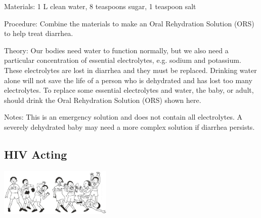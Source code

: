 \begin{multicols}{2}
\begin{description*}
\item[Materials:]{1 L clean water, 8 teaspoons sugar, 1 teaspoon salt}
\item[Procedure:]{Combine the materials to make an Oral Rehydration Solution (ORS) to help treat diarrhea.}
\item[Theory:]{Our bodies need water to function normally,
but we also need a particular concentration of essential electrolytes,
e.g. sodium and potassium. These electrolytes are lost in diarrhea and
they must be replaced. Drinking water alone will not save the life of a
person who is dehydrated and has lost too many electrolytes. To
replace some essential electrolytes and water, the baby, or adult,
should drink the Oral Rehydration Solution (ORS)
shown here.}
\item[Notes:]{This is an emergency solution and does not contain
all electrolytes. A severely dehydrated baby may need a
more complex solution if diarrhea persists.}
\end{description*}

\subsection{HIV Acting} %

\begin{center}
\includegraphics[width=0.4\textwidth]{./img/vso/hiv-acting.jpg}
\end{center}


\end{multicols}
